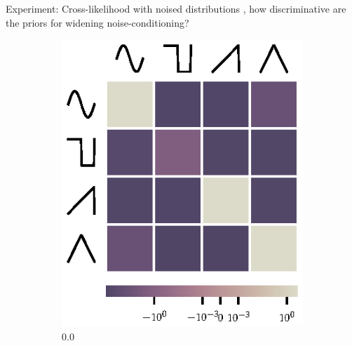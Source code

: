 \documentclass{beamer}
\begin{document}
    \begin{frame}{Experiment: Cross-likelihood with noised distributions}
        , how discriminative are the priors for widening noise-conditioning?
        \begin{figure}
            \centering
            \begin{subfigure}{0.3\textwidth}
                \includegraphics[width=\textwidth]{toy_noise_0/channels_hm.eps}%
                \caption{0.0}%
            \end{subfigure}
            \begin{subfigure}{0.3\textwidth}

\end{subfigure}
\end{figure}
\end{frame}
\end{document}
